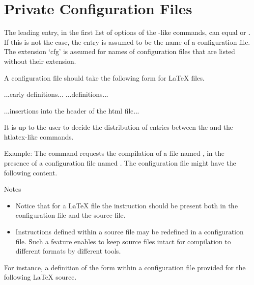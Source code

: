 \section{Private Configuration Files}

The leading entry, in the first list of options of the -like
commands, can equal  or . If this is not the case,
the entry is assumed to be the name of a configuration file. The extension
‘cfg’ is assumed for names of configuration files that are listed without their
extension.

A configuration file should take the following form for LaTeX files.

\begin{texsource}
...early definitions...
...definitions...

...insertions into the header of the html file...
\EndPreamble
\end{texsource}

It is up to the user to decide the distribution of entries between the \texcommand{\Preamble} and the htlatex-like commands.

Example: The command  requests the
compilation of a file named , in the presence of a
configuration file named . The configuration file might have the
following content.

\begin{texsource}
 
\EndPreamble 
\end{texsource}

Notes

\begin{itemize}
  \item Notice that for a LaTeX file the \texcommand{}
    instruction should be present both in the configuration file and the source
    file.

  \item Instructions defined within a source file may be redefined in a
    configuration file. Such a feature enables to keep source files intact for
    compilation to different formats by different tools.
\end{itemize}

For instance, a definition of the form  within a
configuration file provided for the following LaTeX source.

